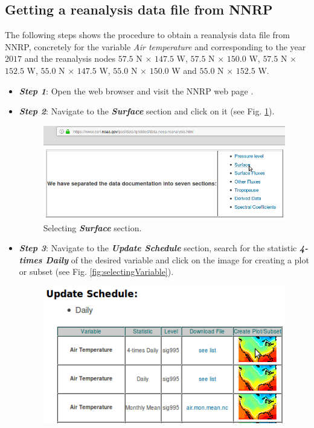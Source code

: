 \begin{onehalfspace}
		\section{Getting a reanalysis data file from NNRP}
		

			The following steps shows the procedure to obtain a reanalysis data file from NNRP, concretely for the variable \textit{Air temperature} and corresponding to the year $2017$ and the reanalysis nodes $57.5$ N $\times$ $147.5$ W, $57.5$ N $\times$ $150.0$ W, $57.5$ N $\times$ $152.5$ W, $55.0$ N $\times$ $147.5$ W, $55.0$ N $\times$ $150.0$ W and $55.0$ N $\times$ $152.5$ W.
			
				\begin{itemize}
					\item \textit{\textbf{Step 1}}: Open the web browser and visit the NNRP  web page \cite{NNRP}.
					\item \textit{\textbf{Step 2}}: Navigate to the \textit{\textbf{Surface}} section and click on it (see Fig. \ref{fig:selectingSurfaceSection}).
						\begin{figure}[ht!]
							\centering
							\includegraphics[scale=0.40]{figures/selectingSurfaceSection.png}
							\caption{Selecting \textit{\textbf{Surface}} section.}
							\label{fig:selectingSurfaceSection}
						\end{figure}
					\item \textit{\textbf{Step 3}}: Navigate to the \textit{\textbf{Update Schedule}} section, search for the statistic \textit{\textbf{4-times Daily}} of the desired variable and click on the image for creating a plot or subset (see Fig. \ref{fig:selectingVariable}).
						\begin{figure}[ht!]
							\centering
							\includegraphics[scale=0.55]{figures/selectingVariable.png}

\end{figure}
\end{itemize}
\end{onehalfspace}
